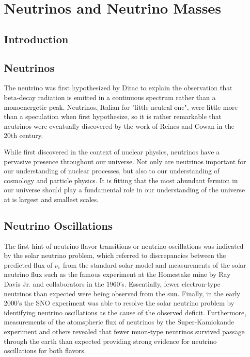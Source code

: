 
\chapter{Neutrinos and Neutrino Masses}

\section{Introduction}



\section{Neutrinos}

The neutrino was first hypothesized by Dirac to explain the observation that beta-decay radiation is emitted in a continuous spectrum rather than a monoenergetic peak. Neutrinos, Italian for "little neutral one", were little more than a speculation when first hypothesize, so it is rather remarkable that neutrinos were eventually discovered by the work of Reines and Cowan in the 20th century. 

While first discovered in the context of nuclear physics, neutrinos have a pervasive presence throughout our universe. Not only are neutrinos important for our understanding of nuclear processes, but also to our understanding of cosmology and particle physics. It is fitting that the most abundant fermion in our universe should play a fundamental role in our understanding of the universe at is largest and smallest scales.

\section{Neutrino Oscillations}

The first hint of neutrino flavor transitions or neutrino oscillations was indicated by the solar neutrino problem, which referred to discrepancies between the predicted flux of $\nu_e$ from the standard solar model and measurements of the solar neutrino flux such as the famous experiment at the Homestake mine by Ray Davis Jr. and collaborators in the 1960's. Essentially, fewer electron-type neutrinos than expected were being observed from the sun. Finally, in the early 2000's the SNO experiment was able to resolve the solar neutrino problem by identifying neutrino oscillations as the cause of the observed deficit. Furthermore, measurements of the atomspheric flux of neutrinos by the Super-Kamiokande experiment and others revealed that fewer muon-type neutrinos survived passage through the earth than expected providing strong evidence for neutrino oscillations for both flavors.

